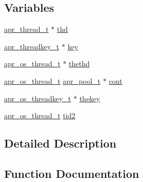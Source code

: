 \subsection*{Variables}
\begin{DoxyCompactItemize}
\item 
\hyperlink{structapr__thread__t}{apr\+\_\+thread\+\_\+t} $\ast$ \hyperlink{group__apr__os__thread_ga9abc6c7c01b67b5c7fb8a13fb333f126}{thd}
\item 
\hyperlink{structapr__threadkey__t}{apr\+\_\+threadkey\+\_\+t} $\ast$ \hyperlink{group__apr__os__thread_gaaf5a0e1dc0653e5c8f9ed9194efa2877}{key}
\item 
\hyperlink{group__apr__portabile_ga4ccd9519af148ccf9cff850dd58f00b6}{apr\+\_\+os\+\_\+thread\+\_\+t} $\ast$ \hyperlink{group__apr__os__thread_ga36ed15fc156d4cd6cad8129ac1cf35b4}{thethd}
\item 
\hyperlink{group__apr__portabile_ga4ccd9519af148ccf9cff850dd58f00b6}{apr\+\_\+os\+\_\+thread\+\_\+t} \hyperlink{structapr__pool__t}{apr\+\_\+pool\+\_\+t} $\ast$ \hyperlink{group__apr__os__thread_gaf91c8c5adc1663e6364c60bc4564f2ad}{cont}
\item 
\hyperlink{group__apr__portabile_ga0a228496d8a1a9b3be744ddb101a3e76}{apr\+\_\+os\+\_\+threadkey\+\_\+t} $\ast$ \hyperlink{group__apr__os__thread_ga808496a92c9edb0012ed1f8ffc09be8b}{thekey}
\item 
\hyperlink{group__apr__portabile_ga4ccd9519af148ccf9cff850dd58f00b6}{apr\+\_\+os\+\_\+thread\+\_\+t} \hyperlink{group__apr__os__thread_ga9b33c06bfe51ab2536c566759e6a2e2d}{tid2}
\end{DoxyCompactItemize}


\subsection{Detailed Description}


\subsection{Function Documentation}
